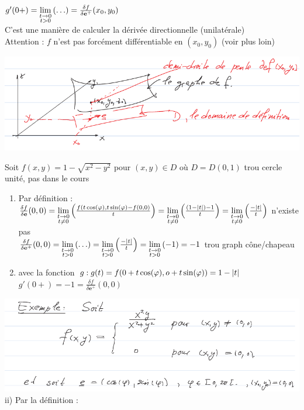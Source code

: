 \documentclass[12pt,a4paper]{article}
\begin{document}
$g'(0+) = \lim\limits_{\substack{t\to 0 \\ t > 0}}\left(\ldots\right) = \frac{\delta f}{\delta \textbf{e}^+}(x_0,y_0)$\\
 C'est une manière de calculer la dérivée directionnelle (unilatérale)\\
 Attention : $f$ n'est pas forcément différentiable en $(x_0,y_0)$ (voir plus loin)
\begin{center}
	\includegraphics[scale=0.5]{images/plan_differentiable}
\end{center}
 Soit $f(x,y) = 1-\sqrt{x^2-y^2}$ pour $(x,y) \in D$ où $D = D(0,1)$ {trou cercle unité, pas dans le cours}
\begin{enumerate}
	\item 	Par définition : $\frac{\delta f}{\delta \textbf{e}}(0,0) =\lim\limits_{\substack{t\to 0 \\ t\neq 0}}\left(\frac{f(t\cos(\varphi),t\sin(\varphi) - f(0,0)}{t}\right) = \lim\limits_{\substack{t\to 0 \\ t\neq 0}}\left(\frac{(1-|t|) -1}{t}\right) = \lim\limits_{\substack{t\to 0 \\ t\neq 0}}\left(\frac{-|t|}{t}\right)$ n'existe pas\\
			$\frac{\delta f}{\delta \textbf{e}^+}(0,0) = \lim\limits_{\substack{t\to 0 \\ t>0}}\left(\ldots\right) = \lim\limits_{\substack{t\to 0 \\ t>0}}\left(\frac{-|t|}{t}\right) = \lim\limits_{\substack{t\to 0 \\ t>0}}\left(-1\right) = -1$
			{trou graph cône/chapeau}
			
	\item 	avec la fonction $g : \\ g(t) = f(0+t\cos(\varphi), o + t\sin(\varphi)) = 1-|t|$\\
			$g'(0+) = -1 = \frac{\delta f}{\delta \textbf{e}^+}(0,0)$
\end{enumerate}
\includegraphics[scale=0.5]{images/plan_exemple_2}\\
ii) Par la définition :\\
\end{document}
